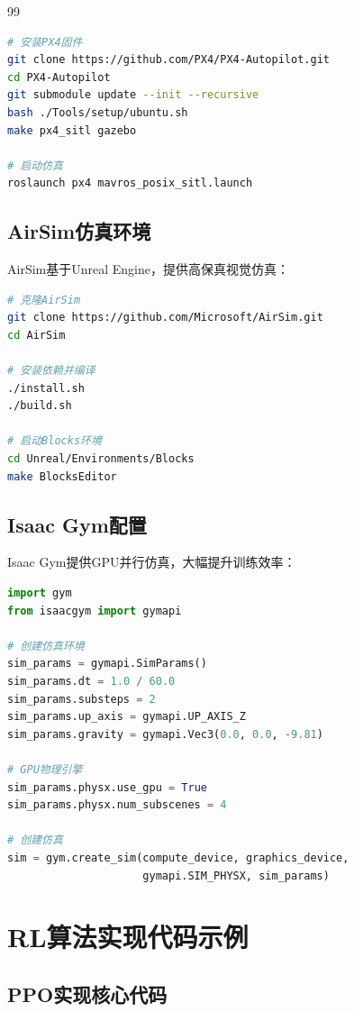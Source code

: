 \documentclass[12pt,a4paper]{ctexart}
\begin{document}
\begin{thebibliography}{99}
\begin{lstlisting}[language=bash, caption=Gazebo安装与配置]
# 安装PX4固件
git clone https://github.com/PX4/PX4-Autopilot.git
cd PX4-Autopilot
git submodule update --init --recursive
bash ./Tools/setup/ubuntu.sh
make px4_sitl gazebo

# 启动仿真
roslaunch px4 mavros_posix_sitl.launch
\end{lstlisting}

\subsection{AirSim仿真环境}

AirSim基于Unreal Engine，提供高保真视觉仿真：

\begin{lstlisting}[language=bash, caption=AirSim安装]
# 克隆AirSim
git clone https://github.com/Microsoft/AirSim.git
cd AirSim

# 安装依赖并编译
./install.sh
./build.sh

# 启动Blocks环境
cd Unreal/Environments/Blocks
make BlocksEditor
\end{lstlisting}

\subsection{Isaac Gym配置}

Isaac Gym提供GPU并行仿真，大幅提升训练效率：

\begin{lstlisting}[language=python, caption=Isaac Gym环境配置]
import gym
from isaacgym import gymapi

# 创建仿真环境
sim_params = gymapi.SimParams()
sim_params.dt = 1.0 / 60.0
sim_params.substeps = 2
sim_params.up_axis = gymapi.UP_AXIS_Z
sim_params.gravity = gymapi.Vec3(0.0, 0.0, -9.81)

# GPU物理引擎
sim_params.physx.use_gpu = True
sim_params.physx.num_subscenes = 4

# 创建仿真
sim = gym.create_sim(compute_device, graphics_device, 
                     gymapi.SIM_PHYSX, sim_params)
\end{lstlisting}

\section{RL算法实现代码示例}\label{app:code}

\subsection{PPO实现核心代码}


\end{thebibliography}
\end{document}
